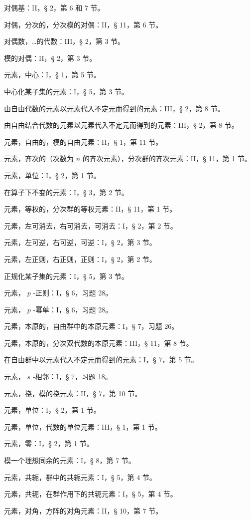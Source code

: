 对偶基：II，§ 2，第 6 和 7 节。

对偶，分次的，分次模的对偶：II，§ 11，第 6 节。

对偶数，…的代数：III，§ 2，第 3 节。

模的对偶：II，§ 2，第 3 节。

元素，中心：I，§ 1，第 5 节。

中心化某子集的元素：I，§ 5，第 3 节。

由自由代数的元素以元素代入不定元而得到的元素：III，§ 2，第 8 节。

由自由结合代数的元素以元素代入不定元而得到的元素：III，§ 2，第 8 节。

元素，自由的，模的自由元素：II，§ 1，第 11 节。

元素，齐次的（次数为 \(n\) 的齐次元素），分次群的齐次元素：II，§ 11，第 1 节。

元素，单位：I，§ 2，第 1 节。

在算子下不变的元素：I，§ 3，第 2 节。

元素，等权的，分次群的等权元素：II，§ 11，第 1 节。

元素，左可消去，右可消去，可消去：I，§ 2，第 2 节。

元素，左可逆，右可逆，可逆：I，§ 2，第 3 节。

元素，左正则，右正则，正则：I，§ 2，第 2 节。

正规化某子集的元素：I，§ 5，第 3 节。

元素， \(p\) -正则：I，§ 6，习题 28。

元素， \(p\) -幂单：I，§ 6，习题 28。

元素，本原的，自由群中的本原元素：I，§ 7，习题 26。

元素，本原的，分次双代数的本原元素：III，§ 11，第 8 节。

在自由群中以元素代入不定元而得到的元素：I，§ 7，第 5 节。

元素， \(s\) -相邻：I，§ 7，习题 18。

元素，挠，模的挠元素：II，§ 7，第 10 节。

元素，单位：I，§ 2，第 1 节。

元素，单位，代数的单位元素：III，§ 1，第 1 节。

元素，零：I，§ 2，第 1 节。

模一个理想同余的元素：I，§ 8，第 7 节。

元素，共轭，群中的共轭元素：I，§ 5，第 4 节。

元素，共轭，在群作用下的共轭元素：I，§ 5，第 4 节。

元素，对角，方阵的对角元素：II，§ 10，第 7 节。


